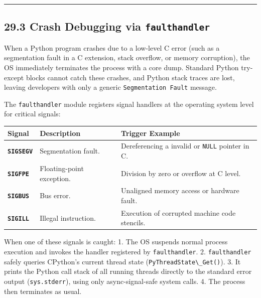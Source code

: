 \begin{center}\rule{0.5\linewidth}{0.5pt}\end{center}

\hypertarget{crash-debugging-via-faulthandler}{%
\subsection{\texorpdfstring{29.3 Crash Debugging via
\texttt{faulthandler}}{29.3 Crash Debugging via faulthandler}}\label{crash-debugging-via-faulthandler}}

When a Python program crashes due to a low-level C error (such as a
segmentation fault in a C extension, stack overflow, or memory
corruption), the OS immediately terminates the process with a core dump.
Standard Python try-except blocks cannot catch these crashes, and Python
stack traces are lost, leaving developers with only a generic
\passthrough{\lstinline!Segmentation Fault!} message.

The \passthrough{\lstinline!faulthandler!} module registers signal
handlers at the operating system level for critical signals:

\begin{longtable}[]{@{}lll@{}}
\toprule
Signal & Description & Trigger Example \\
\midrule
\endhead
\textbf{\passthrough{\lstinline!SIGSEGV!}} & Segmentation fault. &
Dereferencing a invalid or \passthrough{\lstinline!NULL!} pointer in
C. \\
\textbf{\passthrough{\lstinline!SIGFPE!}} & Floating-point exception. &
Division by zero or overflow at C level. \\
\textbf{\passthrough{\lstinline!SIGBUS!}} & Bus error. & Unaligned
memory access or hardware fault. \\
\textbf{\passthrough{\lstinline!SIGILL!}} & Illegal instruction. &
Execution of corrupted machine code stencils. \\
\bottomrule
\end{longtable}

When one of these signals is caught: 1. The OS suspends normal process
execution and invokes the handler registered by
\passthrough{\lstinline!faulthandler!}. 2.
\passthrough{\lstinline!faulthandler!} safely queries CPython's current
thread state (\passthrough{\lstinline!PyThreadState\_Get()!}). 3. It
prints the Python call stack of all running threads directly to the
standard error output (\passthrough{\lstinline!sys.stderr!}), using only
async-signal-safe system calls. 4. The process then terminates as usual.

